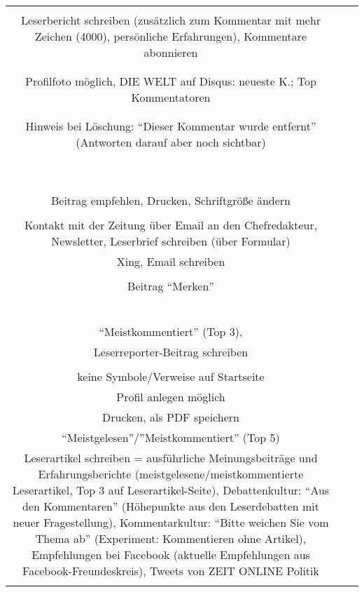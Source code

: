 \begin{landscape}
\begin{tabular}{ccc}
{		\\
		Leserbericht schreiben (zusätzlich zum Kommentar mit mehr Zeichen (4000), persönliche Erfahrungen), Kommentare abonnieren\\
		&
		\\
		\\
		Profilfoto möglich, DIE WELT auf Disqus: neueste K.; Top Kommentatoren\\
		\\
		\\
		Hinweis bei Löschung: ``Dieser Kommentar wurde entfernt'' (Antworten darauf aber noch sichtbar)\\
		&
		\\
		\\
		\\
		\\
		\\
		\\
		&
		\\
		\\
		\\
		Beitrag empfehlen, Drucken, Schriftgröße ändern\\
		\\
		Kontakt mit der Zeitung über Email an den Chefredakteur, Newsletter, Leserbrief schreiben (über Formular)
		&
		\\
		Xing, Email schreiben\\
		\\
		Beitrag ``Merken''\\
		\\
		\\
		&
		\\
		\\
		\\
		\\
		``Meistkommentiert''  (Top 3), \\
		Leserreporter-Beitrag schreiben \\
		&
		\\
		keine Symbole/Verweise auf Startseite\\
		Profil anlegen möglich\\
		Drucken, als PDF speichern\\
		``Meistgelesen''/''Meistkommentiert'' (Top 5)\\
		Leserartikel schreiben = ausführliche Meinungsbeiträge und Erfahrungsberichte (meistgelesene/meistkommentierte Leserartikel, Top 3 auf Leserartikel-Seite), Debattenkultur: ``Aus den Kommentaren'' (Höhepunkte aus den Leserdebatten mit neuer Fragestellung), Kommentarkultur: ``Bitte weichen Sie vom Thema ab'' (Experiment: Kommentieren ohne Artikel), Empfehlungen bei Facebook (aktuelle Empfehlungen aus Facebook-Freundeskreis), Tweets von ZEIT ONLINE Politik\\
}
\end{tabular}
\end{landscape}
